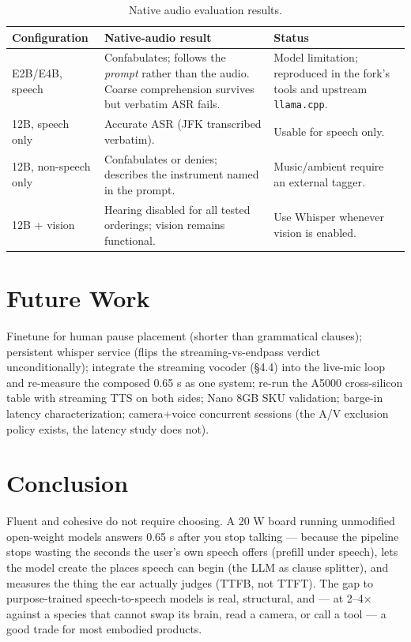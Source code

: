 \documentclass[journal]{IEEEtran}
\begin{document}
    \begin{table}[H]
    \small
    \begin{tabularx}{\columnwidth}{lXX}
    \hline
    Configuration & Native-audio result & Status \\
    \hline
    E2B/E4B, speech &
    Confabulates; follows the \emph{prompt} rather than the audio. Coarse comprehension survives but verbatim ASR fails. &
    Model limitation; reproduced in the fork's tools and upstream \texttt{llama.cpp}. \\
    
    12B, speech only &
    Accurate ASR (JFK transcribed verbatim). &
    Usable for speech only. \\
    
    12B, non-speech only &
    Confabulates or denies; describes the instrument named in the prompt. &
    Music/ambient require an external tagger. \\
    
    12B + vision &
    Hearing disabled for all tested orderings; vision remains functional. &
    Use Whisper whenever vision is enabled. \\
    \end{tabularx}
    \caption{Native audio evaluation results.}
    \end{table}


\section{Future Work}

Finetune for human pause placement (shorter than grammatical clauses); persistent whisper service (flips the streaming-vs-endpass verdict unconditionally); integrate the streaming vocoder (§4.4) into the live-mic loop and re-measure the composed 0.65 s as one system; re-run the A5000 cross-silicon table with streaming TTS on both sides; Nano 8GB SKU validation; barge-in latency characterization; camera+voice concurrent sessions (the A/V exclusion policy exists, the latency study does not).

\section{Conclusion}

Fluent and cohesive do not require choosing. A 20 W board running unmodified open-weight models answers 0.65 s after you stop talking — because the pipeline stops wasting the seconds the user's own speech offers (prefill under speech), lets the model create the places speech can begin (the LLM as clause splitter), and measures the thing the ear actually judges (TTFB, not TTFT). The gap to purpose-trained speech-to-speech models is real, structural, and — at 2–4× against a species that cannot swap its brain, read a camera, or call a tool — a good trade for most embodied products.
\end{document}
